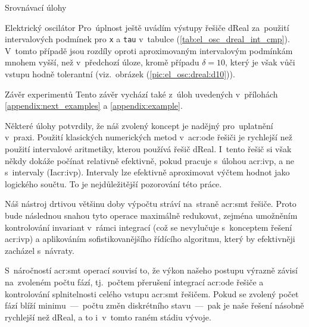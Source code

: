 \documentclass[thesis=M,czech]{FITthesis}[2012/06/26]
\newcommand{\acrlabel}[1]{acr:#1}
\newcommand{\acr}[1]{\acrshort{\acrlabel{#1}}}
\newcommand{\id}[1]{\texttt{#1}}
\newcommand{\rf}[1]{\ref{#1}}
\newcommand{\picL}{pic}
\newcommand{\rfPic}[1]{(\rf{\picL:#1})}
\newcommand{\tabL}{tab}
\newcommand{\rfTab}[1]{(\rf{\tabL:#1})}
\begin{document}
\begin{section}{Srovnávací úlohy}
\begin{subsection}{Elektrický oscilátor}
Pro~úplnost ještě uvádím výstupy řešiče dReal
za~použití intervalových podmínek pro \id{x} a \id{tau}
v~tabulce \rfTab{el_osc_dreal_int_cmp}.
V~tomto případě jsou rozdíly
oproti aproximovaným intervalovým podmínkám
mnohem vyšší, než v~předchozí úloze,
kromě případu ${\delta = 10}$,
který je však vůči vstupu hodně tolerantní
(viz.~obrázek \rfPic{el_osc:dreal:d10}).
\end{subsection} %


\begin{subsection}{Závěr experimentů}\label{ss:exp:examples:conclusion}
Tento závěr vychází také z~úloh
uvedených v~přílohách
\rf{appendix:next_examples} a \rf{appendix:example}.

Některé úlohy potvrdily, že náš zvolený koncept
je nadějný pro~uplatnění v~praxi.
Použití klasických numerických metod v~\acr{ode} řešiči
je rychlejší než použití intervalové aritmetiky,
kterou používá řešič dReal.
I~tento řešič si však někdy dokáže počínat relativně efektivně,
pokud pracuje s~úlohou \acr{ivp},
a ne s~intervaly (I\acr{ivp}).
Intervaly lze efektivně aproximovat výčtem hodnot
jako logického součtu.
To je nejdůležitější pozorování této práce.

Náš nástroj drtivou většinu doby výpočtu stráví
na~straně \acr{smt} řešiče.
Proto bude následnou snahou
tyto operace maximálně redukovat,
zejména umožněním kontrolování invariant v~rámci integrací
(což se nevylučuje s~konceptem řešení \acr{ivp})
a aplikováním sofistikovanějšího
řídícího algoritmu, který by efektivněji zacházel s~návraty.

S~náročností \acr{smt} operací souvisí to,
že výkon našeho postupu výrazně závisí
na~zvoleném počtu fází,
tj.~počtem přerušení integrací \acr{ode} řešiče
a kontrolování splnitelnosti celého vstupu \acr{smt} řešičem.
Pokud se zvolený počet fází blíží
minimu~---~počtu změn diskrétního
stavu~---~pak je naše řešení násobně rychlejší než dReal,
a to i~v~tomto raném stádiu vývoje.
\end{subsection} %


\end{section} %

\end{document}
